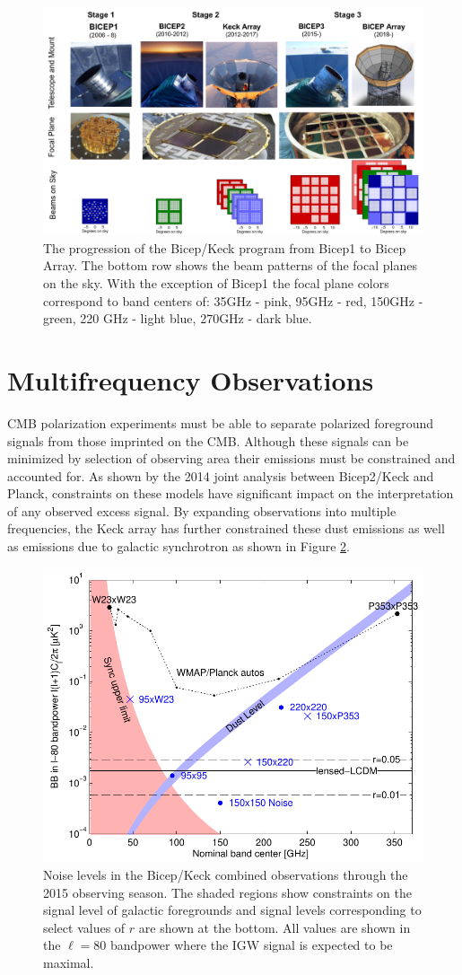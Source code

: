 \documentclass[12pt]{article}
\begin{document}
\begin{figure}
	\center
	\includegraphics[width=.8\textwidth]{BK_progression.png}
	\caption{The progression of the Bicep/Keck program from Bicep1 to Bicep
	Array. The bottom row shows the beam patterns of the focal planes on the
	sky. With the exception of Bicep1 the focal plane colors correspond to
	band centers of: 35GHz - pink, 95GHz - red, 150GHz - green, 220 GHz -
	light blue, 270GHz - dark blue.}
	\label{fig:BK_progression}
\end{figure}




\section{Multifrequency Observations}

CMB polarization experiments must be able to separate polarized foreground
signals from those imprinted on the CMB. Although these signals can be
minimized by selection of observing area their emissions must be constrained
and accounted for. As shown by the 2014 joint analysis between Bicep2/Keck and
Planck, constraints on these models have significant impact on the
interpretation of any observed excess signal. By expanding observations into
multiple frequencies, the Keck array has further constrained these dust
emissions as well as emissions due to galactic synchrotron as shown in Figure
\ref{fig:noilev}.
\begin{figure}
	\center
	\includegraphics[width=.7\textwidth]{noilev_bk15.pdf}
	\caption{Noise levels in the Bicep/Keck combined observations through the
	2015 observing season. The shaded regions show constraints on the signal
	level of galactic foregrounds and signal levels corresponding to select values
	of $r$ are shown at the bottom. All values are shown in the $\ell=80$
	bandpower where the IGW signal is expected to be maximal.}
	\label{fig:noilev}
\end{figure}
\end{document}
